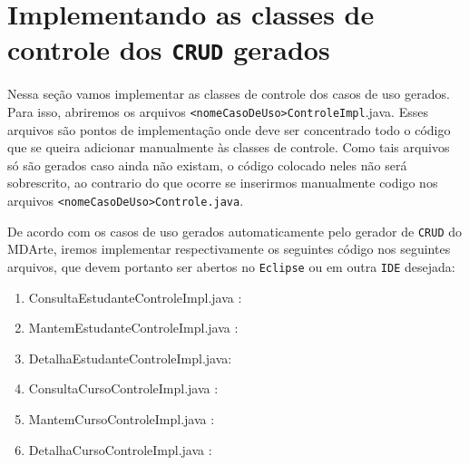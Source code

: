 \section{Implementando as classes de controle dos \texttt{CRUD} gerados}

Nessa seção vamos implementar as classes de controle dos casos de uso gerados.
Para isso, abriremos os arquivos \texttt{<nomeCasoDeUso>ControleImpl}.java.
Esses arquivos são pontos de implementação onde deve ser concentrado todo o
código que se queira adicionar manualmente às classes de controle. Como tais
arquivos só são gerados caso ainda não existam, o código colocado neles não será
sobrescrito, ao contrario do que ocorre se inserirmos manualmente codigo nos
arquivos \texttt{<nomeCasoDeUso>Controle.java}.

De acordo com os casos de uso gerados automaticamente pelo gerador de
\texttt{CRUD} do MDArte, iremos implementar respectivamente os seguintes código
nos seguintes arquivos, que devem portanto ser abertos no \texttt{Eclipse} ou em
outra \texttt{IDE} desejada:

\begin{enumerate}
\item ConsultaEstudanteControleImpl.java :
\begin{framed}
	
\end{framed}
		
\item MantemEstudanteControleImpl.java :
\begin{framed}
	
\end{framed}

\item DetalhaEstudanteControleImpl.java:
\begin{framed}
	
\end{framed}

\item ConsultaCursoControleImpl.java :
\begin{framed}
	
\end{framed}

\item MantemCursoControleImpl.java :
\begin{framed}
	
\end{framed}

\item DetalhaCursoControleImpl.java :
\begin{framed}
	
\end{framed}

\end{enumerate}

